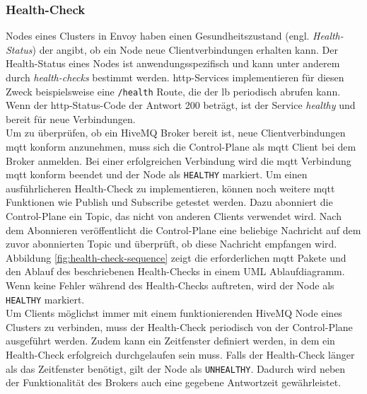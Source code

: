\subsubsection{Health-Check} \label{ss:health-check}
Nodes eines Clusters in Envoy haben einen Gesundheitszustand (engl. \textit{Health-Status}) der angibt, ob ein Node neue Clientverbindungen erhalten kann.
Der Health-Status eines Nodes ist anwendungsspezifisch und kann unter anderem durch \textit{health-checks} bestimmt werden.
\ac{http}-Services implementieren für diesen Zweck beispielsweise eine \verb|/health| Route, die der \acl{lb} periodisch abrufen kann. Wenn der \ac{http}-Status-Code der Antwort 200 beträgt, ist der Service \textit{healthy} und bereit für neue Verbindungen.
\\
Um zu überprüfen, ob ein HiveMQ Broker bereit ist, neue Clientverbindungen \ac{mqtt} konform anzunehmen, muss sich die Control-Plane als \ac{mqtt} Client bei dem Broker anmelden.
Bei einer erfolgreichen Verbindung wird die \ac{mqtt} Verbindung \ac{mqtt} konform beendet und der Node als \verb|HEALTHY| markiert.
Um einen ausführlicheren Health-Check zu implementieren, können noch weitere \ac{mqtt} Funktionen wie Publish und Subscribe getestet werden. Dazu abonniert die Control-Plane ein Topic, das nicht von anderen Clients verwendet wird. Nach dem Abonnieren veröffentlicht die Control-Plane eine beliebige Nachricht auf dem zuvor abonnierten Topic und überprüft, ob diese Nachricht empfangen wird. Abbildung \ref{fig:health-check-sequence} zeigt die erforderlichen \ac{mqtt} Pakete und den Ablauf des beschriebenen Health-Checks in einem UML Ablaufdiagramm. Wenn keine Fehler während des Health-Checks auftreten, wird der Node als \verb|HEALTHY| markiert.
\\
Um Clients möglichst immer mit einem funktionierenden HiveMQ Node eines Clusters zu verbinden, muss der Health-Check periodisch von der Control-Plane ausgeführt werden.
Zudem kann ein Zeitfenster definiert werden, in dem ein Health-Check erfolgreich durchgelaufen sein muss.
Falls der Health-Check länger als das Zeitfenster benötigt, gilt der Node als \verb|UNHEALTHY|.
Dadurch wird neben der Funktionalität des Brokers auch eine gegebene Antwortzeit gewährleistet.
